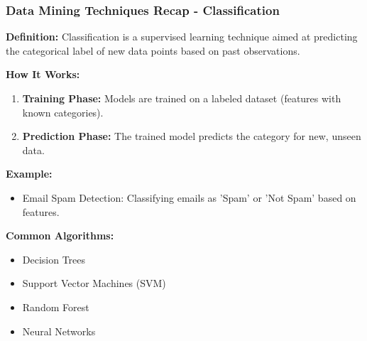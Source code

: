 \documentclass[aspectratio=169]{beamer}
\begin{document}
\begin{frame}[fragile]
    \frametitle{Data Mining Techniques Recap - Classification}
    
    \textbf{Definition:} Classification is a supervised learning technique aimed at predicting the categorical label of new data points based on past observations.
    
    \textbf{How It Works:}
    \begin{enumerate}
        \item \textbf{Training Phase:} Models are trained on a labeled dataset (features with known categories).
        \item \textbf{Prediction Phase:} The trained model predicts the category for new, unseen data.
    \end{enumerate}
    
    \textbf{Example:} 
    \begin{itemize}
        \item Email Spam Detection: Classifying emails as 'Spam' or 'Not Spam' based on features.
    \end{itemize}
    
    \textbf{Common Algorithms:}
    \begin{itemize}
        \item Decision Trees
        \item Support Vector Machines (SVM)
        \item Random Forest
        \item Neural Networks
    \end{itemize}
\end{frame}
\end{document}
